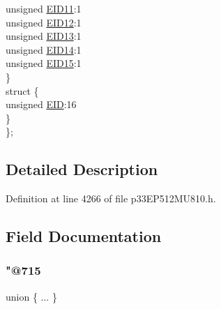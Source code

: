 \begin{DoxyCompactItemize}
\begin{tabbing}
\>\>unsigned \hyperlink{structtag_c1_r_x_f9_e_i_d_b_i_t_s_a710bdb0d602deb021b0be99066008018}{EID11}:1\\
\>\>unsigned \hyperlink{structtag_c1_r_x_f9_e_i_d_b_i_t_s_aa347bb85867bd8d4e0124f7cff8c6472}{EID12}:1\\
\>\>unsigned \hyperlink{structtag_c1_r_x_f9_e_i_d_b_i_t_s_a37d5f3edcbf6ef62f848fd4f3c584f79}{EID13}:1\\
\>\>unsigned \hyperlink{structtag_c1_r_x_f9_e_i_d_b_i_t_s_a7ffc0b0e0d99b8476b6f9a45337c17ab}{EID14}:1\\
\>\>unsigned \hyperlink{structtag_c1_r_x_f9_e_i_d_b_i_t_s_a293cd7dc1746257fa75a60cbd9383cd7}{EID15}:1\\
\>\} \\
\>struct \{\\
\>\>unsigned \hyperlink{structtag_c1_r_x_f9_e_i_d_b_i_t_s_ae80b378c9141f7c03e0b4e55b5f4b54d}{EID}:16\\
\>\} \\
\}; \\

\end{tabbing}\end{DoxyCompactItemize}


\subsection{Detailed Description}


Definition at line 4266 of file p33\+E\+P512\+M\+U810.\+h.



\subsection{Field Documentation}
\mbox{\label{structtag_c1_r_x_f9_e_i_d_b_i_t_s_ac31bafa6e1e39c8dc22676165d2afc2b}} 
\subsubsection{\texorpdfstring{"@715}{@715}}
{\footnotesize\ttfamily union \{ ... \} }

\mbox{\label{structtag_c1_r_x_f9_e_i_d_b_i_t_s_ae80b378c9141f7c03e0b4e55b5f4b54d}} 

